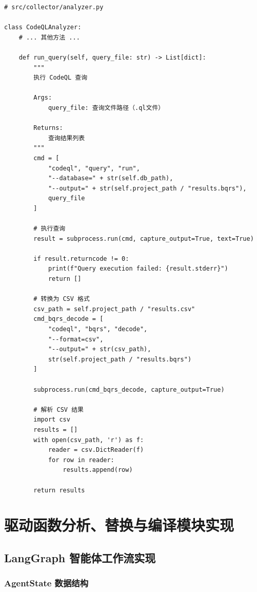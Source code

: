 \begin{lstlisting}[style=Python,abovecaptionskip=0pt,belowcaptionskip=0pt]
# src/collector/analyzer.py

class CodeQLAnalyzer:
    # ... 其他方法 ...

    def run_query(self, query_file: str) -> List[dict]:
        """
        执行 CodeQL 查询

        Args:
            query_file: 查询文件路径（.ql文件）

        Returns:
            查询结果列表
        """
        cmd = [
            "codeql", "query", "run",
            "--database=" + str(self.db_path),
            "--output=" + str(self.project_path / "results.bqrs"),
            query_file
        ]

        # 执行查询
        result = subprocess.run(cmd, capture_output=True, text=True)

        if result.returncode != 0:
            print(f"Query execution failed: {result.stderr}")
            return []

        # 转换为 CSV 格式
        csv_path = self.project_path / "results.csv"
        cmd_bqrs_decode = [
            "codeql", "bqrs", "decode",
            "--format=csv",
            "--output=" + str(csv_path),
            str(self.project_path / "results.bqrs")
        ]

        subprocess.run(cmd_bqrs_decode, capture_output=True)

        # 解析 CSV 结果
        import csv
        results = []
        with open(csv_path, 'r') as f:
            reader = csv.DictReader(f)
            for row in reader:
                results.append(row)

        return results
\end{lstlisting}

\section{驱动函数分析、替换与编译模块实现}
\label{sec:builder_impl}

\subsection{LangGraph 智能体工作流实现}

\subsubsection{AgentState 数据结构}

